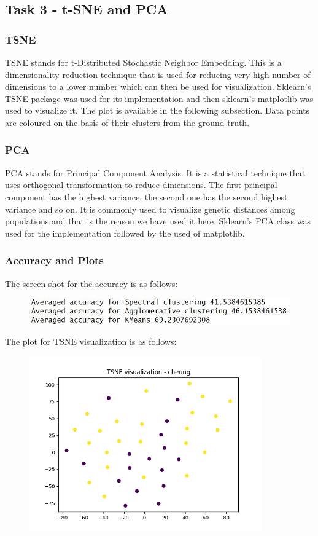 \documentclass[11pt]{article}
\begin{document}
\subsection{Task 3 - t-SNE and PCA}
\subsubsection{TSNE}
TSNE stands for t-Distributed Stochastic Neighbor Embedding. This is a dimensionality reduction technique that is used for reducing very high number of dimensions to a lower number which can then be used for visualization. Sklearn's TSNE package was used for its implementation and then sklearn's matplotlib was used to visualize it. The plot is available in the following subsection. Data points are coloured on the basis of their clusters from the ground truth.

\subsubsection{PCA}
PCA stands for Principal Component Analysis. It is a statistical technique that uses orthogonal transformation to reduce dimensions. The first principal component has the highest variance, the second one has the second highest variance and so on. It is commonly used to visualize genetic distances among populations and that is the reason we have used it here. Sklearn's PCA class was used for the implementation followed by the used of matplotlib.

\subsubsection{Accuracy and Plots}

The screen shot for the accuracy is as follows:
\begin{figure}[h]
\includegraphics[width=12cm]{Accuracy.JPG}
\end{figure}

The plot for TSNE visualization is as follows:
\begin{figure}[H]
\includegraphics[width=10cm]{TSNE_Visualization.png}
\end{figure}
\end{document}
